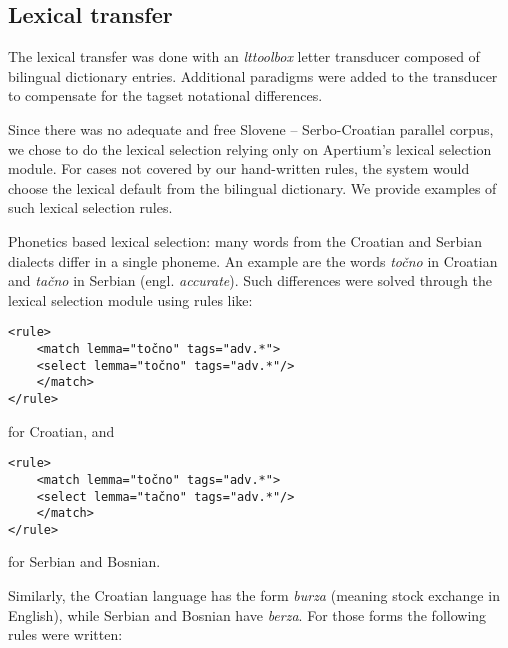 \subsection{Lexical transfer}
The lexical transfer was done with an \emph{lttoolbox} letter
transducer composed of bilingual dictionary entries. Additional
paradigms were added to the transducer to compensate for the tagset
notational differences.

Since there was no adequate and free Slovene -- Serbo-Croatian parallel corpus, 
we chose to do the lexical selection relying only on Apertium's lexical selection module.
For cases not covered by our hand-written rules, the system would choose the lexical 
default from the bilingual dictionary.
We provide examples of such lexical selection rules.

Phonetics based lexical selection: many words from the Croatian and Serbian dialects differ in a single phoneme.
An example are the words \emph{točno} in Croatian and \emph{tačno} in Serbian (engl. \emph{accurate}).
Such differences were solved through the lexical selection module using rules like:

{\small
\begin{Verbatim}
<rule>
    <match lemma="točno" tags="adv.*">
	<select lemma="točno" tags="adv.*"/>
    </match>
</rule>
\end{Verbatim}
}
for Croatian, and
{\small
\begin{Verbatim}
<rule>
    <match lemma="točno" tags="adv.*">
	<select lemma="tačno" tags="adv.*"/>
    </match>
</rule>
\end{Verbatim}
}
for Serbian and Bosnian.

Similarly, the Croatian language has the form \emph{burza} (meaning stock exchange in English), while Serbian and Bosnian have \emph{berza}. 
For those forms the following rules were written:

